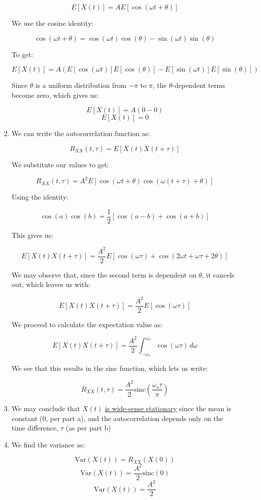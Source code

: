 \begin{enumerate}
\begin{enumerate}
        $$E[X(t)]=AE[\cos(\omega t+\theta)]$$

        We use the cosine identity:

        $$\cos(\omega t+\theta)=\cos(\omega t)\cos(\theta)-\sin(\omega t)\sin(\theta)$$

        To get:

        $$E[X(t)]=A\left( E[\cos(\omega t)]E[\cos(\theta)]-E[\sin(\omega t)]E[\sin(\theta)] \right)$$

        Since $\theta$ is a uniform distribution from $-\pi$ to $\pi$, the $\theta$-dependent terms become zero, which gives us:

        $$E[X(t)]=A(0-0)$$
        $$\boxed{E[X(t)]=0}$$

      \item We can write the autocorrelation function as:

        $$R_{XX}(t,\tau)=E[X(t)X(t+\tau)]$$

        We substitute our values to get:

        $$R_{XX}(t,\tau)=A^2E[\cos(\omega t+\theta)\cos(\omega(t+\tau)+\theta)]$$

        Using the identity:

        $$\cos(a)\cos(b)=\frac{1}{2}\left[ \cos(a-b)+\cos(a+b) \right]$$

        This gives us:

        $$E[X(t)X(t+\tau)]=\frac{A^2}{2}E\left[ \cos(\omega \tau)+\cos(2\omega t+\omega\tau+2\theta) \right]$$

        We may observe that, since the second term is dependent on $\theta$, it cancels out, which leaves us with:

        $$E[X(t)X(t+\tau)]=\frac{A^2}{2}E\left[ \cos(\omega \tau)\right]$$

        We proceed to calculate the expectation value as:

        $$E[X(t)X(t+\tau)]=\frac{A^2}{2}\int_{-\omega_o}^{\omega_o}\cos(\omega\tau)\,d\omega$$

        We see that this results in the sinc function, which lets us write:

        $$\boxed{R_{XX}(t,\tau)=\frac{A^2}{2}\text{sinc}\left( \frac{\omega_o\tau}{\pi} \right)}$$

      \item We may conclude that $X(t)$ \underline{is wide-sense stationary} since the mean is constant (0, per part a), and the autocorrelation depends only on the time difference, $\tau$ (as per part b)

      \item We find the variance as:

        $$\text{Var}(X(t))=R_{XX}(X(0))$$
        $$\text{Var}(X(t))=\frac{A^2}{2} \text{sinc}(0)$$
        $$\boxed{\text{Var}(X(t))=\frac{A^2}{2}}$$

    \end{enumerate}

\end{enumerate}



